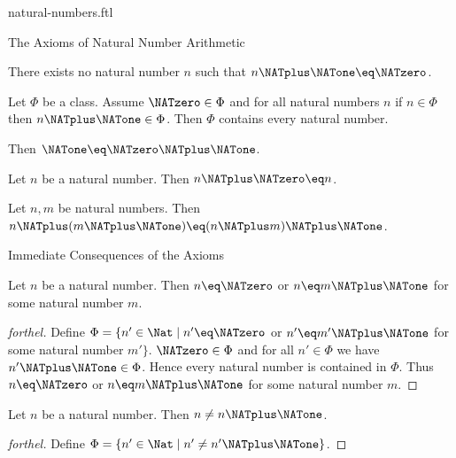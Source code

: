 \documentclass{naproche-library}
\begin{document}
\begin{smodule}[title=Natural Numbers]{natural-numbers.ftl}
\begin{sfragment}{The Axioms of Natural Number Arithmetic}
  \begin{axiom}[forthel,id=ARITHMETIC_01_4454289938317312]
    There exists no natural number $n$ such that $n \NATplus \NATone \eq \NATzero$.
  \end{axiom}

  \begin{axiom}[forthel,title=Induction,id=ARITHMETIC_01_4764664342773760]
    Let $\Phi$ be a class.
    Assume $\NATzero \in \Phi$ and for all natural numbers $n$ if $n \in \Phi$ then
    $n \NATplus \NATone \in \Phi$.
    Then $\Phi$ contains every natural number.
  \end{axiom}

  \begin{axiom}[forthel,id=ARITHMETIC_03_5962332515874540]
    Then $\NATone \eq \NATzero \NATplus \NATone$.
  \end{axiom}

  \begin{axiom}[forthel,id=ARITHMETIC_03_4827955356237824]
    Let $n$ be a natural number.
    Then $n \NATplus \NATzero \eq n$.
  \end{axiom}

  \begin{axiom}[forthel,id=ARITHMETIC_03_4427935386238924]
    Let $n, m$ be natural numbers.
    Then $n \NATplus (m \NATplus \NATone) \eq (n \NATplus m) \NATplus \NATone$.
  \end{axiom}
\end{sfragment}

\begin{sfragment}{Immediate Consequences of the Axioms}
  \begin{proposition}[forthel,id=ARITHMETIC_01_4966080109871104]
    Let $n$ be a natural number.
    Then $n \eq \NATzero$ or $n \eq m \NATplus \NATone$ for some natural number $m$.
  \end{proposition}
  \begin{proof}[forthel]
    Define $\Phi = \{ n' \in \Nat \mid n' \eq \NATzero$ or $n' \eq m' \NATplus \NATone$ for some natural number $m' \}$.
    $\NATzero \in \Phi$ and for all $n' \in  \Phi$ we have $n' \NATplus \NATone \in \Phi$.
    Hence every natural number is contained in $\Phi$.
    Thus $n \eq \NATzero$ or $n \eq m \NATplus \NATone$ for some natural number $m$.
  \end{proof}

  \begin{proposition}[forthel,id=ARITHMETIC_01_5996049267163136]
    Let $n$ be a natural number.
    Then $n \neq n \NATplus \NATone$.
  \end{proposition}
  \begin{proof}[forthel]
    Define $\Phi = \{ n' \in \Nat \mid n' \neq n' \NATplus \NATone \}$.


\end{proof}
\end{sfragment}
\end{smodule}
\end{document}
